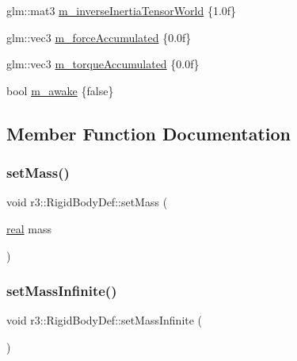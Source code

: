 \begin{DoxyCompactItemize}
\item 
glm\+::mat3 \mbox{\hyperlink{structr3_1_1_rigid_body_def_acf08b5556bde4c822264a7dc6c180e90}{m\+\_\+inverse\+Inertia\+Tensor\+World}} \{1.\+0f\}
\item 
glm\+::vec3 \mbox{\hyperlink{structr3_1_1_rigid_body_def_ae3b46fdab5cf6b6d6724794a1d3b3cdb}{m\+\_\+force\+Accumulated}} \{0.\+0f\}
\item 
glm\+::vec3 \mbox{\hyperlink{structr3_1_1_rigid_body_def_ab12c90dd6547748d3d7f27e53833a9e6}{m\+\_\+torque\+Accumulated}} \{0.\+0f\}
\item 
bool \mbox{\hyperlink{structr3_1_1_rigid_body_def_a3d48ea179d5ebc3a906949a623236c5a}{m\+\_\+awake}} \{false\}
\end{DoxyCompactItemize}


\subsection{Member Function Documentation}
\mbox{\label{structr3_1_1_rigid_body_def_a7b84fd988312a41f84ac0505f6c3de47}} 
\subsubsection{\texorpdfstring{set\+Mass()}{setMass()}}
{\footnotesize\ttfamily void r3\+::\+Rigid\+Body\+Def\+::set\+Mass (\begin{DoxyParamCaption}\item[{\mbox{\hyperlink{namespacer3_ab2016b3e3f743fb735afce242f0dc1eb}{real}}}]{mass }\end{DoxyParamCaption})}

\mbox{\label{structr3_1_1_rigid_body_def_a6912018eac59c46be887cf07e7aadc36}} 
\subsubsection{\texorpdfstring{set\+Mass\+Infinite()}{setMassInfinite()}}
{\footnotesize\ttfamily void r3\+::\+Rigid\+Body\+Def\+::set\+Mass\+Infinite (\begin{DoxyParamCaption}{ }\end{DoxyParamCaption})}




